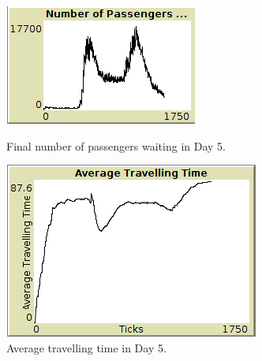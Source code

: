 \begin{figure}[htbp]
\centering
\begin{minipage}{.48\textwidth}
  \includegraphics[width=\linewidth]{src/nr_pass_waiting5.png}
  \caption{Final number of passengers waiting in Day 5.}
  \label{fig:pass_waiting5}
\end{minipage}
\begin{minipage}{.48\textwidth}
  \includegraphics[width=\linewidth]{src/avg_tt5.png}
  \caption{Average travelling time in Day 5.}
  \label{fig:avg_tt5}
\end{minipage}
\end{figure}
